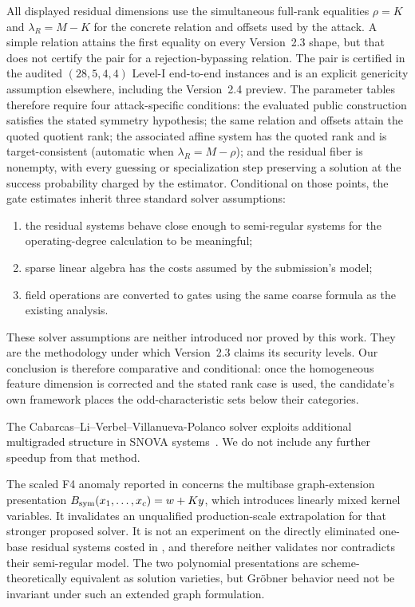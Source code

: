 \documentclass[11pt]{article}
\newcommand{\SNOVA}{\textsf{SNOVA}}
\begin{document}
All displayed residual dimensions use the simultaneous full-rank equalities
$\rho=K$ and $\lambda_R=M-K$ for the concrete relation and offsets used by
the attack.  A simple relation attains the first equality on every Version~2.3
shape, but that does not certify the pair for a rejection-bypassing relation.
The pair is certified in the audited $(28,5,4,4)$ Level-I end-to-end instances
and is an explicit genericity assumption elsewhere, including the Version~2.4
preview.  The parameter tables therefore require four attack-specific
conditions: the evaluated public construction satisfies the stated symmetry
hypothesis; the same relation and offsets attain the quoted quotient rank; the
associated affine system has the quoted rank and is target-consistent (automatic
when $\lambda_R=M-\rho$); and the residual fiber is nonempty, with every
guessing or specialization step preserving a solution at the success probability
charged by the estimator.  Conditional on
those points, the gate estimates inherit three standard solver assumptions:
\begin{enumerate}
\item the residual systems behave close enough to semi-regular systems for the operating-degree calculation to be meaningful;
\item sparse linear algebra has the costs assumed by the submission's model;
\item field operations are converted to gates using the same coarse formula as the existing analysis.
\end{enumerate}
These solver assumptions are neither introduced nor proved by this work.  They
are the methodology under which Version~2.3 claims its security levels.  Our
conclusion is therefore comparative and conditional: once the homogeneous
feature dimension is corrected and the stated rank case is used, the
candidate's own framework places the odd-characteristic sets below their
categories.

The Cabarcas--Li--Verbel--Villanueva-Polanco solver exploits additional multigraded structure in \SNOVA{} systems~\cite{Cabarcas2025SNOVA}.  We do not include any further speedup from that method.

The scaled F4 anomaly reported in  concerns the multibase
graph-extension presentation $B_{\rm sym}(x_1,\ldots,x_c)=w+Ky$, which
introduces linearly mixed kernel variables.  It invalidates an unqualified
production-scale extrapolation for that stronger proposed solver.  It is not an
experiment on the directly eliminated one-base residual systems costed in
, and therefore neither validates nor contradicts their
semi-regular model.  The two polynomial presentations are scheme-theoretically
equivalent as solution varieties, but Gr\"obner behavior need not be invariant
under such an extended graph formulation.
\end{document}
